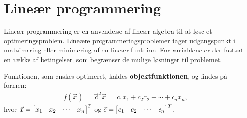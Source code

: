 \chapter{Lineær programmering}

\begin{comment}
Ting til retter
- bør "def 5.5 mulige løsninger og den mulige mængde" komme før "standard maksimums- og minimumsproblemer"? %
- Jeg er ikke sikker på alle termer i dette afsnit. Jeg rettede kriteriefunktion til objektfunktion, da der blev brugt objektfunktion i projektforslaget.
- Jeg er lidt inkonsistent med anvendelsen af [1 2 3] og [1,2,3]. er ikke helt sikker på hvad der ser bedst ud. %
- Er der brug for at skrive betingelserne og objektfunktionen ud i starten, eller er det nok at det skrives som vektor-vektor produkt?
\end{comment}

Lineær programmering er en anvendelse af lineær algebra til at løse et optimeringsproblem. Lineære programmeringsproblemer tager udgangspunkt i maksimering eller minimering af en lineær funktion. For variablene er der fastsat en række af betingelser, som begrænser de mulige løsninger til problemet.


Funktionen, som ønskes optimeret, kaldes \textbf{objektfunktionen}, og findes på formen:
\begin{align}
f(\vec{x})\ = \vec{c}^T \vec{x} \ =  c_1x_1 + c_2x_2 + \cdots + c_nx_n,
\end{align}
hvor $\vec{x}= \begin{bmatrix} x_1 & x_2 & \cdots & x_n \end{bmatrix}^T$ og $\vec{c}= \begin{bmatrix} c_1 & c_2 & \cdots & c_n \end{bmatrix}^T$.

\begin{comment}
Bør muligvis være en defintion, behøver ikke at skrives ud, men så skal f(\vec{x}) frem for f(x_1, ..., x_n).  Men det er jo variable repræcenteret ved en vektor så måske introducerer f(x_1, ..., x_n), udenfor definitionen.
\begin{defn}
Betragt et lineært programmerings problem, da er \textbf{objektfunktionen}
\begin{align*}
f(\vec{x}) = \vec{c}^T \cdot \vec{x}, 
\end{align*}
for $\vec{x}, \vec{c} \in \mathds{R}^n$, funktionen, som ønskes optimeret.
\end{defn} Eller noget, det er vigtigt at denne definition, vil kræve at vektor x og c bliver introduceret i den bindende tekst.
\end{comment}


